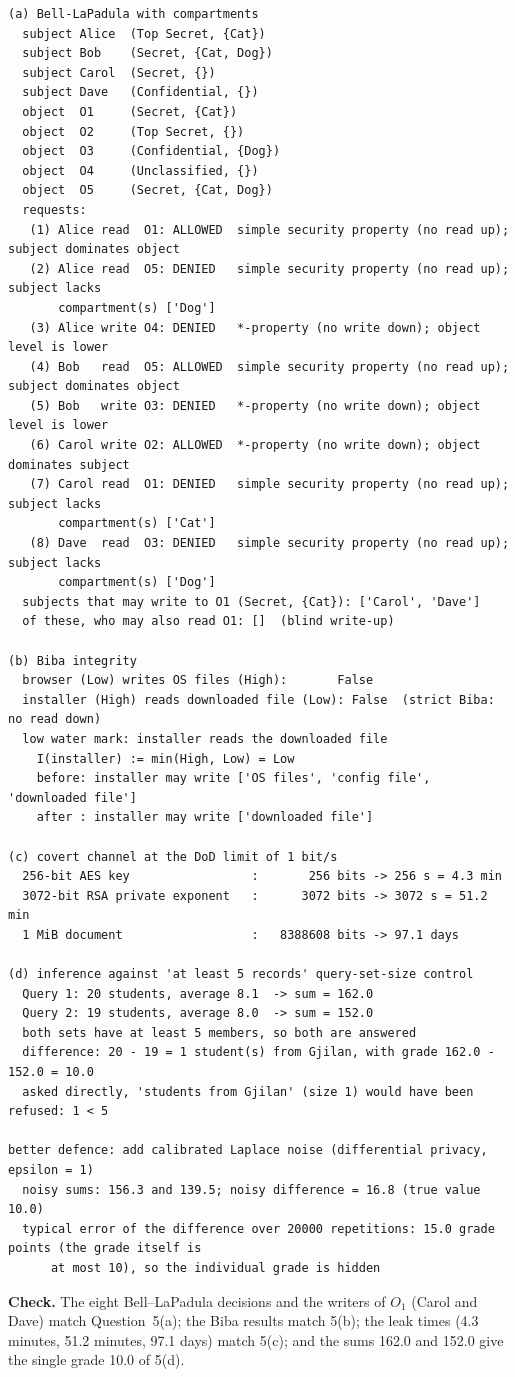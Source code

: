 \documentclass[11pt,a4paper]{article}
\begin{document}
\begin{Verbatim}[fontsize=\footnotesize, frame=single]
(a) Bell-LaPadula with compartments
  subject Alice  (Top Secret, {Cat})
  subject Bob    (Secret, {Cat, Dog})
  subject Carol  (Secret, {})
  subject Dave   (Confidential, {})
  object  O1     (Secret, {Cat})
  object  O2     (Top Secret, {})
  object  O3     (Confidential, {Dog})
  object  O4     (Unclassified, {})
  object  O5     (Secret, {Cat, Dog})
  requests:
   (1) Alice read  O1: ALLOWED  simple security property (no read up); subject dominates object
   (2) Alice read  O5: DENIED   simple security property (no read up); subject lacks
       compartment(s) ['Dog']
   (3) Alice write O4: DENIED   *-property (no write down); object level is lower
   (4) Bob   read  O5: ALLOWED  simple security property (no read up); subject dominates object
   (5) Bob   write O3: DENIED   *-property (no write down); object level is lower
   (6) Carol write O2: ALLOWED  *-property (no write down); object dominates subject
   (7) Carol read  O1: DENIED   simple security property (no read up); subject lacks
       compartment(s) ['Cat']
   (8) Dave  read  O3: DENIED   simple security property (no read up); subject lacks
       compartment(s) ['Dog']
  subjects that may write to O1 (Secret, {Cat}): ['Carol', 'Dave']
  of these, who may also read O1: []  (blind write-up)

(b) Biba integrity
  browser (Low) writes OS files (High):       False
  installer (High) reads downloaded file (Low): False  (strict Biba: no read down)
  low water mark: installer reads the downloaded file
    I(installer) := min(High, Low) = Low
    before: installer may write ['OS files', 'config file', 'downloaded file']
    after : installer may write ['downloaded file']

(c) covert channel at the DoD limit of 1 bit/s
  256-bit AES key                 :       256 bits -> 256 s = 4.3 min
  3072-bit RSA private exponent   :      3072 bits -> 3072 s = 51.2 min
  1 MiB document                  :   8388608 bits -> 97.1 days

(d) inference against 'at least 5 records' query-set-size control
  Query 1: 20 students, average 8.1  -> sum = 162.0
  Query 2: 19 students, average 8.0  -> sum = 152.0
  both sets have at least 5 members, so both are answered
  difference: 20 - 19 = 1 student(s) from Gjilan, with grade 162.0 - 152.0 = 10.0
  asked directly, 'students from Gjilan' (size 1) would have been refused: 1 < 5

better defence: add calibrated Laplace noise (differential privacy, epsilon = 1)
  noisy sums: 156.3 and 139.5; noisy difference = 16.8 (true value 10.0)
  typical error of the difference over 20000 repetitions: 15.0 grade points (the grade itself is
      at most 10), so the individual grade is hidden
\end{Verbatim}
\textbf{Check.} The eight Bell--LaPadula decisions and the writers of $O_1$ (Carol and Dave) match Question~5(a);
the Biba results match 5(b); the leak times (4.3 minutes, 51.2 minutes, 97.1 days) match 5(c); and the sums 162.0
and 152.0 give the single grade 10.0 of 5(d).
\end{document}
